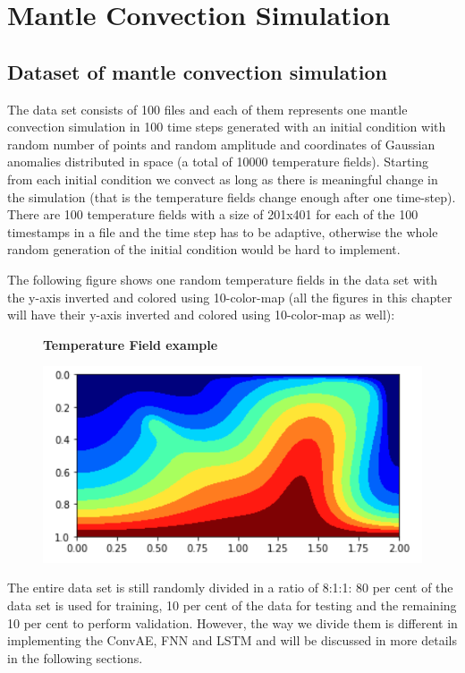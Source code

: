 \chapter{Mantle Convection Simulation}\label{chap:evaluation}

\section{Dataset of mantle convection simulation}

The data set consists of 100 files and each of them represents one mantle convection simulation in 100 time steps generated with an initial condition with random number of points and random amplitude and coordinates of Gaussian anomalies distributed in space (a total of 10000 temperature fields). Starting from each initial condition we convect as long as there is meaningful change in the simulation (that is the temperature fields change enough after one time-step). There are 100 temperature fields with a size of 201x401 for each of the 100 timestamps in a file and the time step has to be adaptive, otherwise the whole random generation of the initial condition would be hard to implement.

The following figure shows one random temperature fields in the data set with the y-axis inverted and colored using 10-color-map (all the figures in this chapter will have their y-axis inverted and colored using 10-color-map as well):

\begin{figure}[H]
    \textbf{Temperature Field example}\par\medskip
    \includegraphics[scale=0.6]{figures/mantle_convection_images/temperature_field_example.png}
\end{figure}

The entire data set is still randomly divided in a ratio of 8:1:1: 80 per cent of the data set is used for training, 10 per cent of the data for testing and the remaining 10 per cent to perform validation. However, the way we divide them is different in implementing the ConvAE, FNN and LSTM and will be discussed in more details in the following sections.

